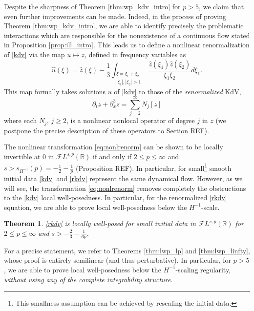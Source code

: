 \documentclass[%
11pt,  reqno]{amsart}
\newcommand{\5}{\textup{V}}
\DeclareMathOperator*{\intt}{\int}
\newtheorem{theorem}{Theorem} [section]
\theoremstyle{remark}
\newcommand{\R}{\mathbb{R}}
\numberwithin{equation}{section}
\numberwithin{theorem}{section}
\begin{document}
	Despite the sharpness of Theorem \ref{thm:wp_kdv_intro} for $p>5$, we claim that even further improvements can be made. Indeed, in the process of proving Theorem \ref{thm:wp_kdv_intro}, we are able to identify precisely the problematic interactions which are responsible for the nonexistence of a continuous flow stated in Proposition \ref{prop:ill_intro}. This leads us to define a nonlinear renormalization of \eqref{kdv} via the map $u\mapsto z$, defined in frequency variables as
	\begin{equation}\label{eq:nonlrenorm}
		\widehat{u}(\xi)=\widehat{z}(\xi) - \frac{1}{3}	\intt_{\substack{\xi=\xi_1+\xi_2\\|\xi_1|, |\xi_2|>1}}\frac{\widehat{z}( \xi_1) \widehat{z}(\xi_2)}{\xi_1\xi_2}  d\xi_1.
	\end{equation}
	This map formally takes solutions $u$ of \eqref{kdv} to those of the \emph{renormalized} KdV,
	\begin{equation}\label{rkdv}\tag{KdV*}
		\partial_t z + \partial_x^3 z = 
        \sum_{j=2}^\infty N_j[z]
	\end{equation}
	where each $N_j$, $j\ge 2$, is a nonlinear nonlocal operator of degree $j$ in $z$ (we postpone the precise description of these operators to Section REF). 


    
    
	
	The nonlinear transformation \eqref{eq:nonlrenorm} can be shown to be locally invertible at 0 in $\mathcal{F}L^{s,p}(\R)$ if and only if $2\le p\le \infty$ and $s>s_{H^{-1}}(p)=-\frac12 -\frac 1p$ (Proposition REF). In particular, for small\footnote{This smallness assumption can be achieved by rescaling the initial data.} smooth initial data \eqref{kdv} and \eqref{rkdv} represent the same dynamical flow.
	However, as we will see, the transformation \eqref{eq:nonlrenorm} removes completely the obstructions to the \eqref{kdv} local well-posedness. In particular, for the renormalized \eqref{rkdv} equation, we are able to prove local well-posedness below the $H^{-1}$-scale.
	
	\begin{theorem}\label{thm:lwp_rkdv}
		\eqref{rkdv} is locally well-posed for small initial data in $\mathcal{F}L^{s,p}(\R)$ for $2\le p \le \infty$ and $s>-\frac23 - \frac 1{6p}$.
	\end{theorem}
	
	\medskip
	
	
	For a precise statement, we refer to Theorems \ref{thm:lwp_lp} and \ref{thm:lwp_linfty}, whose proof is entirely semilinear (and thus perturbative). In particular, for $p>5$, we are able to prove local well-posedness below the $H^{-1}$-scaling regularity, \emph{without using any of the complete integrability structure}.
	
\end{document}
